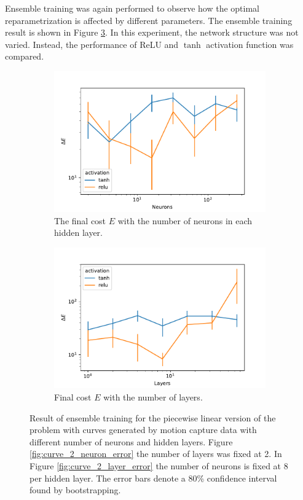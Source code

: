 Ensemble training was again performed to observe how the optimal reparametrization is affected by different parameters. The ensemble training result is shown in Figure \ref{fig:curve_so3_pl_eks}. In this experiment, the network structure was not varied. Instead, the performance of ReLU and \(\tanh\) activation function was compared. 

\begin{figure}[t]
    \begin{subfigure}[t]{0.5\textwidth}
        \centering
        \includegraphics[width=\linewidth]{figures/curve_so3/pl_eks_6/neurons_error.pdf}
        \caption{The final cost \(E\) with the number of neurons in each hidden layer.}\label{fig:curve_so3_pl_neuron_error}
    \end{subfigure}
    \begin{subfigure}[t]{0.5\textwidth}
        \centering
        \includegraphics[width=\linewidth]{figures/curve_so3/pl_eks_6/layer_error.pdf}
        \caption{Final cost \(E\) with the number of layers.}\label{fig:curve_so3_pl_layer_error}
    \end{subfigure}
    \caption{Result of ensemble training for the piecewise linear version of the problem with curves generated by motion capture data with different number of neurons and hidden layers. Figure \ref{fig:curve_2_neuron_error} the number of layers was fixed at 2. In Figure \ref{fig:curve_2_layer_error} the number of neurons is fixed at 8 per hidden layer. The error bars denote a 80\% confidence interval found by bootstrapping.}\label{fig:curve_so3_pl_eks}
\end{figure}

